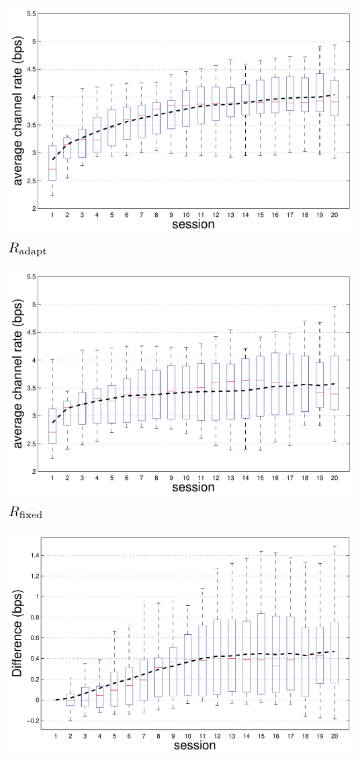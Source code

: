 \documentclass{sigchi}
\begin{document}
\begin{figure}
  \centering
  \begin{subfigure}[b]{\columnwidth}
    \includegraphics[width=\columnwidth]{figures/IUI_BPS_p_adapt.pdf}
    \caption{$R_{\mathrm{adapt}}$}
    \label{fig:channel_rate_adapt}
  \end{subfigure}
  \begin{subfigure}[b]{\columnwidth}
    \includegraphics[width=\columnwidth]{figures/IUI_BPS_p_first.pdf}
    \caption{$R_{\mathrm{fixed}}$}
    \label{fig:channel_rate_fixed}
  \end{subfigure}
  \begin{subfigure}[b]{\columnwidth}
    \includegraphics[width=\columnwidth]{figures/IUI_BPS_diff_p_first.pdf}

\end{subfigure}
\end{figure}
\end{document}
